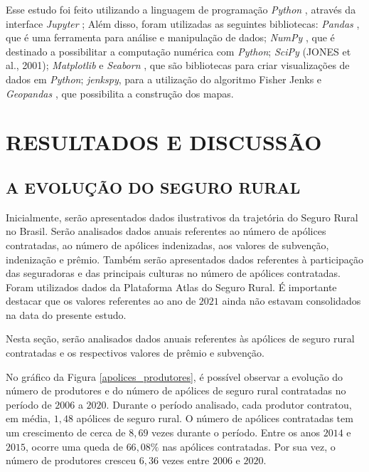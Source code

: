 Esse estudo foi feito utilizando a linguagem de programação \textit{Python} \cite{python17}, através da interface \textit{Jupyter} \cite{jupyter17} \cite{perez07} \cite{kluyver19}; Além disso, foram utilizadas as seguintes bibliotecas: \textit{Pandas} \cite{mckinney10}, que é uma ferramenta  para análise e manipulação de dados; \textit{NumPy} \cite{walt11}, que é destinado a possibilitar a computação numérica com \textit{Python}; \textit{SciPy} (JONES et al., 2001); %
\textit{Matplotlib} \cite{hunter07} e \textit{Seaborn} \cite{waskom14}, que são bibliotecas para criar visualizações  de dados em \textit{Python}; \textit{jenkspy}, para a utilização do algoritmo Fisher Jenks \cite{jenks77} e \textit{Geopandas} \cite{jordahl14}, que possibilita a construção dos mapas. 

\section{RESULTADOS E DISCUSSÃO}

\subsection{A EVOLUÇÃO DO SEGURO RURAL} 

Inicialmente, serão apresentados dados ilustrativos da trajetória do Seguro Rural no Brasil. Serão analisados dados anuais referentes ao número de apólices contratadas, ao número de apólices indenizadas, aos valores de subvenção, indenização e prêmio. Também serão apresentados dados referentes à participação das seguradoras e das principais culturas no número de apólices contratadas. Foram utilizados dados da Plataforma Atlas do Seguro Rural. É importante destacar que os valores referentes ao ano de $2021$ ainda não estavam consolidados na data do presente estudo.


Nesta seção, serão analisados dados anuais referentes às apólices de seguro rural contratadas e os respectivos valores de prêmio e subvenção. 

No gráfico da Figura \ref{apolices_produtores}, é possível observar a evolução do número de produtores e do número de apólices de seguro rural contratadas no período de $2006$ a $2020$. Durante o período analisado, cada produtor contratou, em média, $1,48$ apólices de seguro rural. O número de apólices contratadas tem um crescimento de cerca de $8,69$ vezes durante o período. Entre os anos $2014$ e $2015$, ocorre uma queda de $66,08\%$ nas apólices contratadas. Por sua vez, o número de produtores cresceu $6,36$ vezes entre $2006$ e $2020$.

